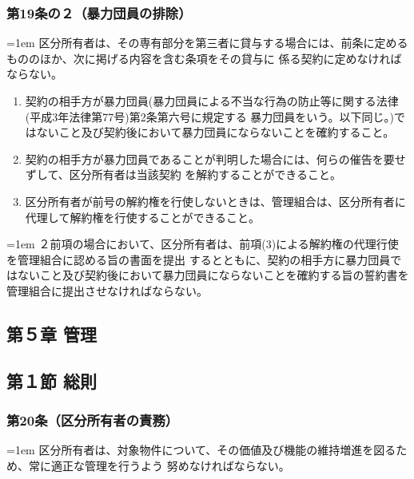 \documentclass[
  luatex,
  paper=a4paper,
  fontsize=11pt,
  jafontsize=11pt,
  jlreq_notes,
]{jlreq}
\newcommand{\joumain}[1]{%
  \noindent\hangindent=1em\hangafter=1
  \hspace{1em}#1%
}
\newcommand{\kou}[2]{%
  \par\noindent\hangindent=1em\hangafter=1
  #1\hspace{1em}#2%
}
\begin{document}
  \subsubsection*{第19条の２（暴力団員の排除）}
  \joumain{区分所有者は、その専有部分を第三者に貸与する場合には、前条に定めるもののほか、次に掲げる内容を含む条項をその貸与に
  係る契約に定めなければならない。}
  \begin{enumerate}
    \item 契約の相手方が暴力団員(暴力団員による不当な行為の防止等に関する法律(平成3年法律第77号)第2条第六号に規定する
    暴力団員をいう。以下同じ。)ではないこと及び契約後において暴力団員にならないことを確約すること。
    \item 契約の相手方が暴力団員であることが判明した場合には、何らの催告を要せずして、区分所有者は当該契約
    を解約することができること。
    \item 区分所有者が前号の解約権を行使しないときは、管理組合は、区分所有者に代理して解約権を行使することができること。
    \end{enumerate}
  \kou{２}{前項の場合において、区分所有者は、前項(3)による解約権の代理行使を管理組合に認める旨の書面を提出
  するとともに、契約の相手方に暴力団員ではないこと及び契約後において暴力団員にならないことを確約する旨の誓約書を
  管理組合に提出させなければならない。}
  
  \begin{center}
  \subsection*{第５章 管理}
  \subsection*{第１節 総則}
  \end{center}

  \subsubsection*{第20条（区分所有者の責務）}
  \joumain{区分所有者は、対象物件について、その価値及び機能の維持増進を図るため、常に適正な管理を行うよう
  努めなければならない。}
\end{document}
